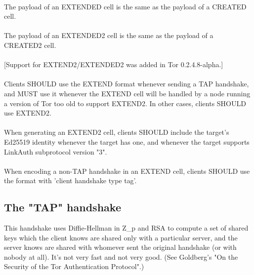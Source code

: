 \paragraph{}
The payload of an EXTENDED cell is the same as the payload of a
CREATED cell.

\paragraph{}
The payload of an EXTENDED2 cell is the same as the payload of a
CREATED2 cell.

\paragraph{}
[Support for EXTEND2/EXTENDED2 was added in Tor 0.2.4.8-alpha.]

\paragraph{}
Clients SHOULD use the EXTEND format whenever sending a TAP
handshake, and MUST use it whenever the EXTEND cell will be handled
by a node running a version of Tor too old to support EXTEND2. In
other cases, clients SHOULD use EXTEND2.

\paragraph{}
When generating an EXTEND2 cell, clients SHOULD include the target's
Ed25519 identity whenever the target has one, and whenever the
target supports LinkAuth subprotocol version "3".

\paragraph{}
When encoding a non-TAP handshake in an EXTEND cell, clients SHOULD
use the format with 'client handshake type tag'.

\subsection{The "TAP" handshake}
This handshake uses Diffie-Hellman in Z\_p and RSA to compute a set of
shared keys which the client knows are shared only with a particular
server, and the server knows are shared with whomever sent the
original handshake (or with nobody at all). It's not very fast and
not very good. (See Goldberg's "On the Security of the Tor
Authentication Protocol".)

